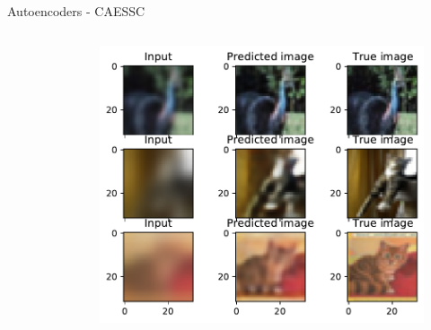 \documentclass{beamer}
\begin{document}
\begin{frame}{Autoencoders - CAESSC\cite{CAESSC}}
{\begin{columns}
\begin{column}[c]{0.30\paperwidth}
\begin{figure}
                    \caption{}     
                \end{figure}
             \end{column}
             \begin{column}[c]{0.30\paperwidth}
                \begin{figure}
                    \centering
                    \includegraphics[width=0.3\paperwidth,keepaspectratio]{caessc/test_CAESSC_d30_f64.pdf}
                    \caption{}                        
                \end{figure}
             \end{column}  
        \end{columns}
    }
\end{frame}
\end{document}
